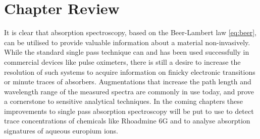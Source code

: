 


\section*{Chapter Review}

It is clear that absorption spectroscopy, based on the Beer-Lambert law
\eqref{eq:beer}, can be utilised to provide valuable information about a
material non-invasively. While the standard single pass technique can and has
been used successfully in commercial devices like pulse oximeters, there is
still a desire to increase the resolution of such systems to acquire
information on finicky electronic transitions or minute traces of absorbers.
Augmentations that increase the path length and wavelength range of the
measured spectra are commonly in use today, and prove a cornerstone to
sensitive analytical techniques. In the coming chapters these improvements to
single pass absorption spectroscopy will be put to use to detect trace
concentrations of chemicals like Rhoadmine 6G and to analyse absorption
signatures of aqueous europium ions.
